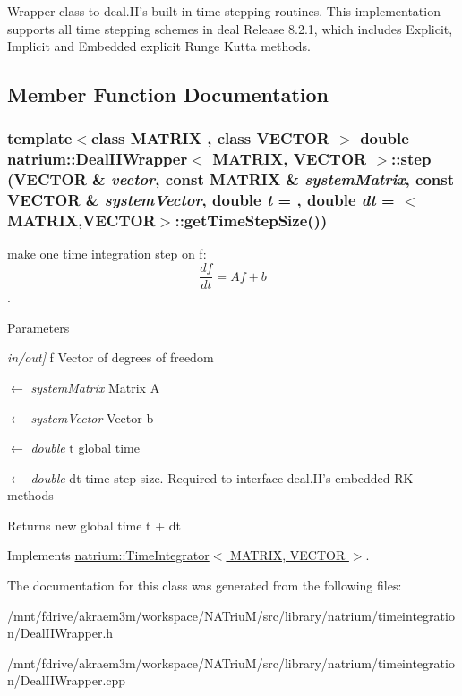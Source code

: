 Wrapper class to deal.II's built-\/in time stepping routines. This implementation supports all time stepping schemes in deal Release 8.2.1, which includes Explicit, Implicit and Embedded explicit Runge Kutta methods. 

\subsection{Member Function Documentation}
\hypertarget{classnatrium_1_1DealIIWrapper_a62621205ff77a46c4f3ef01c3aefb06d}{
\subsubsection[{step}]{\setlength{\rightskip}{0pt plus 5cm}template$<$class MATRIX , class VECTOR $>$ double {\bf natrium::DealIIWrapper}$<$ MATRIX, VECTOR $>$::step (VECTOR \& {\em vector}, \/  const MATRIX \& {\em systemMatrix}, \/  const VECTOR \& {\em systemVector}, \/  double {\em t} = {}, \/  double {\em dt} = {$<$MATRIX,VECTOR$>$::getTimeStepSize()})}}
\label{classnatrium_1_1DealIIWrapper_a62621205ff77a46c4f3ef01c3aefb06d}


make one time integration step on f: \[ \frac{df}{dt} = Af+b \]. 
\begin{DoxyParams}{Parameters}
\item[{\em in/out\mbox{]}}]f Vector of degrees of freedom \item[\mbox{$\leftarrow$} {\em systemMatrix}]Matrix A \item[\mbox{$\leftarrow$} {\em systemVector}]Vector b \item[\mbox{$\leftarrow$} {\em double}]t global time \item[\mbox{$\leftarrow$} {\em double}]dt time step size. Required to interface deal.II's embedded RK methods \end{DoxyParams}
\begin{DoxyReturn}{Returns}
new global time t + dt 
\end{DoxyReturn}


Implements \hyperlink{classnatrium_1_1TimeIntegrator_a1c438e41d183d172d524aa5dc97785fb}{natrium::TimeIntegrator$<$ MATRIX, VECTOR $>$}.

The documentation for this class was generated from the following files:\begin{DoxyCompactItemize}
\item 
/mnt/fdrive/akraem3m/workspace/NATriuM/src/library/natrium/timeintegration/DealIIWrapper.h\item 
/mnt/fdrive/akraem3m/workspace/NATriuM/src/library/natrium/timeintegration/DealIIWrapper.cpp\end{DoxyCompactItemize}
